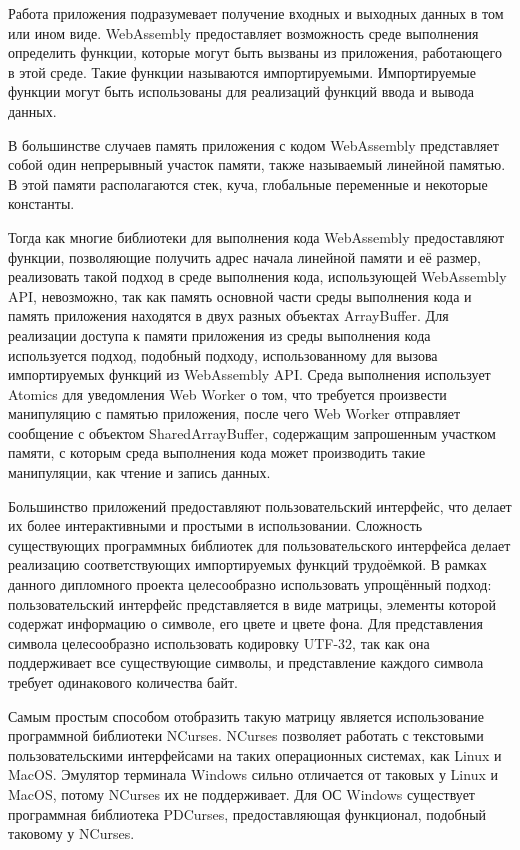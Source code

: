 Работа приложения подразумевает получение входных и выходных данных в том или ином виде.
WebAssembly предоставляет возможность среде выполнения определить функции, которые могут быть вызваны из приложения, работающего в этой среде.
Такие функции называются импортируемыми.
Импортируемые функции могут быть использованы для реализаций функций ввода и вывода данных.

В большинстве случаев память приложения с кодом WebAssembly представляет собой один непрерывный участок памяти, также называемый линейной памятью.
В этой памяти располагаются стек, куча, глобальные переменные и некоторые константы.

Тогда как многие библиотеки для выполнения кода WebAssembly предоставляют функции, позволяющие получить адрес начала линейной памяти и её размер, реализовать такой подход в среде выполнения кода, использующей WebAssembly API, невозможно, так как память основной части среды выполнения кода и память приложения находятся в двух разных объектах ArrayBuffer. 
Для реализации доступа к памяти приложения из среды выполнения кода используется подход, подобный подходу, использованному для вызова импортируемых функций из WebAssembly API.
Среда выполнения использует Atomics для уведомления Web Worker о том, что требуется произвести манипуляцию с памятью приложения, после чего Web Worker отправляет сообщение с объектом SharedArrayBuffer, содержащим запрошенным участком памяти, с которым среда выполнения кода может производить такие манипуляции, как чтение и запись данных.

Большинство приложений предоставляют пользовательский интерфейс, что делает их более интерактивными и простыми в использовании.
Сложность существующих программных библиотек для пользовательского интерфейса делает реализацию соответствующих импортируемых функций трудоёмкой.
В рамках данного дипломного проекта целесообразно использовать упрощённый подход: пользовательский интерфейс представляется в виде матрицы, элементы которой содержат информацию о символе, его цвете и цвете фона.
Для представления символа целесообразно использовать кодировку UTF-32, так как она поддерживает все существующие символы, и представление каждого символа требует одинакового количества байт.

Самым простым способом отобразить такую матрицу является использование программной библиотеки NCurses.
NCurses позволяет работать с текстовыми пользовательскими интерфейсами на таких операционных системах, как Linux и MacOS.
Эмулятор терминала Windows сильно отличается от таковых у Linux и MacOS, потому NCurses их не поддерживает.
Для ОС Windows существует программная библиотека PDCurses, предоставляющая функционал, подобный таковому у NCurses.


